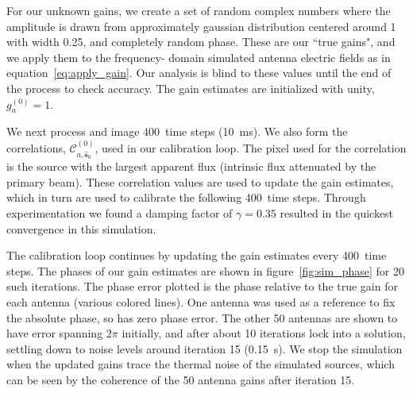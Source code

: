 \documentclass[a4paper,fleqn,usenatbib]{mnras}
\newcommand{\spix}{\ensuremath{\hat{\mathbf{s}}_{0}}}
\newcommand{\Cna}[1][n]{\ensuremath{\mathcal{C}^{(#1)}_{a,\spix}}}
\newcommand{\caliter}{400}
\newcommand{\damp}{\ensuremath{\gamma}}
\begin{document}
For our unknown gains, we create a set of random complex numbers where the amplitude is 
drawn from approximately gaussian distribution centered around 1 with width 0.25, and 
completely random phase. These are our ``true gains", and we apply them to the frequency-
domain simulated antenna electric fields as in equation~\ref{eq:apply_gain}. Our analysis is 
blind to these values until the end of the process to check accuracy. The gain estimates are 
initialized with unity, $g^{(0)}_a=1$.

We next process and image \caliter~time steps (10~ms). We also form the correlations, 
\Cna[0], used in our calibration loop. The pixel used for the correlation is the source with the 
largest apparent flux (intrinsic flux attenuated by the primary beam). These correlation values 
are used to update the gain estimates, which in turn are used to calibrate the following 
\caliter~time steps. Through experimentation we found a damping factor of $\damp=0.35$ 
resulted in the quickest convergence in this simulation.

The calibration loop continues by updating the gain estimates every \caliter~time steps. The 
phases of our gain estimates are shown in figure~\ref{fig:sim_phase} for 20 such iterations. 
The phase error plotted is the phase relative to the true gain for each antenna (various colored 
lines). One antenna was used as a reference to fix the absolute phase, so has zero phase 
error. The other 50 antennas are shown to have error spanning $2\pi$ initially, and after about 
10 iterations lock into a solution, settling down to noise levels around iteration 15 (0.15~s). We 
stop the simulation when the updated gains trace the thermal noise of the simulated sources, 
which can be seen by the coherence of the 50 antenna gains after iteration 15.
\end{document}
